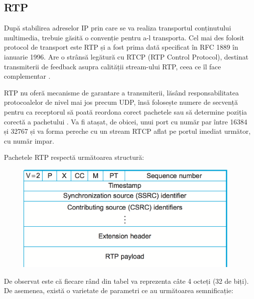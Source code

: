 \subsection{RTP}
\indent \par După stabilirea adreselor IP prin care se va realiza transportul conținutului multimedia, trebuie găsită o convenție pentru a-l transporta. Cel mai des folosit protocol de transport este RTP și a fost prima dată specificat în RFC 1889 în ianuarie 1996. Are o strânsă legătură cu RTCP (RTP Control Protocol), destinat transmiterii de feedback asupra calității stream-ului RTP, ceea ce îl face complementar \cite{rfc3550}.
\indent \par RTP nu oferă mecanisme de garantare a transmiterii, lăsând responsabilitatea protocoalelor de nivel mai jos precum UDP, însă folosește numere de secvență pentru ca receptorul să poată reordona corect pachetele sau să determine poziția corectă a pachetului \cite{rfc3550}. Va fi atașat, de obicei, unui port cu număr par între 16384 și 32767 și va forma pereche cu un stream RTCP aflat pe portul imediat următor, cu număr impar.
\indent \par Pachetele RTP respectă următoarea structură:
\begin{figure}[H]
    \centering
    \includegraphics[width=11cm]{figures/rtp_header.png}
\end{figure}
\indent \par De observat este că fiecare rând din tabel va reprezenta câte 4 octeți (32 de biți). De asemenea, există o varietate de parametri ce au următoarea semnificație:
